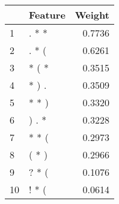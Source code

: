 \begin{tabular}{llr}
\toprule
{} & Feature &  Weight \\
\midrule
1  &   . * * &  0.7736 \\
2  &   . * ( &  0.6261 \\
3  &   * ( * &  0.3515 \\
4  &   * ) . &  0.3509 \\
5  &   * * ) &  0.3320 \\
6  &   ) . * &  0.3228 \\
7  &   * * ( &  0.2973 \\
8  &   ( * ) &  0.2966 \\
9  &   ? * ( &  0.1076 \\
10 &   ! * ( &  0.0614 \\
\bottomrule
\end{tabular}
